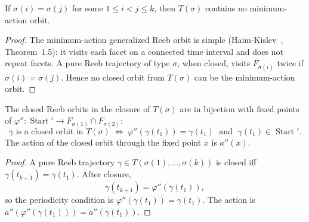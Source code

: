\begin{unverified}
\begin{lemma}\label{lem:prune-simple}
If $\sigma(i) = \sigma(j)$ for some $1 \leq i < j \leq k$,
then $T(\sigma)$ contains no minimum-action orbit.
\end{lemma}

\begin{proof}
The minimum-action generalized Reeb orbit is simple
(Haim-Kislev~\cite{HK2017}, Theorem~1.5):
it visits each facet on a connected time interval and does not repeat facets.
A pure Reeb trajectory of type $\sigma$, when closed,
visits $F_{\sigma(i)}$ twice if $\sigma(i) = \sigma(j)$.
Hence no closed orbit from $T(\sigma)$ can be the minimum-action orbit.
\end{proof}
\end{unverified}


\begin{unverified}
\begin{lemma}\label{lem:fixed-point}
The closed Reeb orbits in the closure of $T(\sigma)$ are in bijection with
fixed points of $\varphi'' \colon \operatorname{Start}' \to F_{\sigma(1)} \cap F_{\sigma(2)}$:
\[
  \gamma \text{ is a closed orbit in } T(\sigma)
  \;\Longleftrightarrow\;
  \varphi''(\gamma(t_1)) = \gamma(t_1)
  \;\text{ and }\;
  \gamma(t_1) \in \operatorname{Start}'.
\]
The action of the closed orbit through the fixed point $x$ is $a''(x)$.
\end{lemma}

\begin{proof}
A pure Reeb trajectory $\gamma \in T(\sigma(1), \ldots, \sigma(k))$
is closed iff $\gamma(t_{k+1}) = \gamma(t_1)$.
After closure,
\[
  \gamma(t_{k+1}) = \varphi''(\gamma(t_1)),
\]
so the periodicity condition is $\varphi''(\gamma(t_1)) = \gamma(t_1)$.
The action is $a''(\varphi''(\gamma(t_1))) = a''(\gamma(t_1))$.
\end{proof}
\end{unverified}


